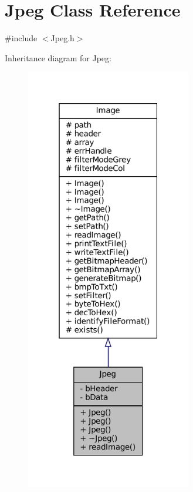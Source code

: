 \hypertarget{classJpeg}{}\section{Jpeg Class Reference}
\label{classJpeg}


{\ttfamily \#include $<$Jpeg.\+h$>$}



Inheritance diagram for Jpeg\+:
\nopagebreak
\begin{figure}[H]
\begin{center}
\leavevmode
\includegraphics[width=205pt]{classJpeg__inherit__graph}
\end{center}
\end{figure}


